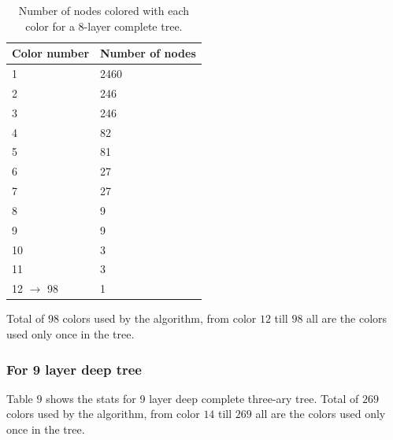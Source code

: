 \documentclass{article}
\theoremstyle{remark}
\begin{document}
\begin{table}[h]
    \centering
    \begin{tabular}{|l|l|}
        \hline
        \textbf{Color number} & \textbf{Number of nodes} \\ \hline
        1                      & 2460                      \\ \hline
        2                      & 246                       \\ \hline
        3                      & 246                       \\ \hline
        4                      & 82                        \\ \hline
        5                      & 81                        \\ \hline
        6                      & 27                        \\ \hline
        7                      & 27                        \\ \hline
        8                      & 9                         \\ \hline
        9                      & 9                         \\ \hline
        10                     & 3                         \\ \hline
        11                     & 3                         \\ \hline
        12 $\to$ 98  & 1\\ \hline
    \end{tabular}
    \caption{Number of nodes colored with each color for a 8-layer complete tree.}
    \label{tab:colors}
\end{table}


Total of $98$ colors used by the algorithm, from color $12$ till $98$ all are the colors used only once in the tree.

\subsubsection{For 9 layer deep tree}
Table $9$ shows the stats for 9 layer deep complete three-ary tree. Total of $269$ colors used by the algorithm, from color $14$ till $269$ all are the colors used only once in the tree.
\end{document}
